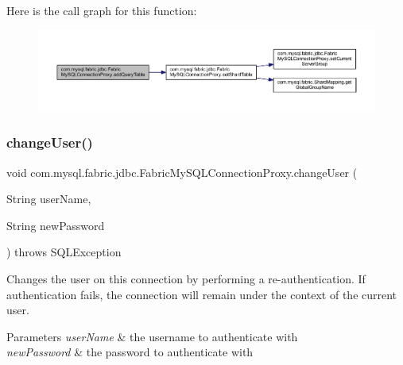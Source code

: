 Here is the call graph for this function\+:\nopagebreak
\begin{figure}[H]
\begin{center}
\leavevmode
\includegraphics[width=350pt]{classcom_1_1mysql_1_1fabric_1_1jdbc_1_1_fabric_my_s_q_l_connection_proxy_a5d4617f3849c2bad7d52f5e2991e01ab_cgraph}
\end{center}
\end{figure}
\mbox{\label{classcom_1_1mysql_1_1fabric_1_1jdbc_1_1_fabric_my_s_q_l_connection_proxy_a3feeb42e32ece9eb869d579ea9d3b457}} 
\subsubsection{\texorpdfstring{change\+User()}{changeUser()}}
{\footnotesize\ttfamily void com.\+mysql.\+fabric.\+jdbc.\+Fabric\+My\+S\+Q\+L\+Connection\+Proxy.\+change\+User (\begin{DoxyParamCaption}\item[{String}]{user\+Name,  }\item[{String}]{new\+Password }\end{DoxyParamCaption}) throws S\+Q\+L\+Exception}

Changes the user on this connection by performing a re-\/authentication. If authentication fails, the connection will remain under the context of the current user.


\begin{DoxyParams}{Parameters}
{\em user\+Name} & the username to authenticate with \\
\hline
{\em new\+Password} & the password to authenticate with \\
\hline
\end{DoxyParams}

